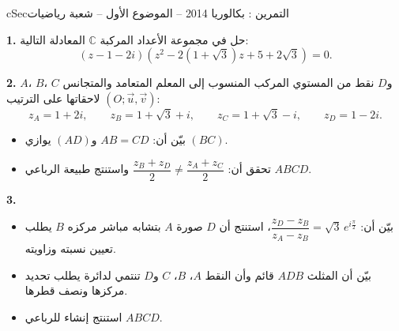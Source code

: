 \documentclass[12pt,a4paper]{article}
\newenvironment{BOX}[2]{\begin{otherlanguage}{english}\begin{arbox}{#1}{#2}}{\end{arbox}\end{otherlanguage}}
\newcounter{exo}
\newenvironment{tamrin}[1]{\stepcounter{exo}\begin{BOX}{cSec}{التمرين \theexo: #1}}{\end{BOX}}
\newenvironment{sq}{\begin{itemize}[leftmargin=2.4em,itemsep=3pt]}{\end{itemize}}
\newcommand{\qa}{\item[(أ)]}\newcommand{\qb}{\item[(ب)]}\newcommand{\qc}{\item[(جـ)]}\newcommand{\qd}{\item[(د)]}\newcommand{\qe}{\item[(هـ)]}
\newcommand{\QQ}[1]{\par\smallskip\textbf{#1.} }
\begin{document}
\providecommand{\MtwoAx}[4]{%
 \draw[gray!20,very thin] (#1,#3) grid (#2,#4);
 \draw[-{Stealth[length=2mm]}] (#1,0)--(#2,0) node[below left]{$x$};
 \draw[-{Stealth[length=2mm]}] (0,#3)--(0,#4) node[below left]{$y$};
 \node[below left,font=\scriptsize] at (0,0){$O$};
 \draw[-{Stealth[length=1.6mm]},thick] (0,0)--(1,0) node[below,font=\scriptsize]{$\vec u$};
 \draw[-{Stealth[length=1.6mm]},thick] (0,0)--(0,1) node[left,font=\scriptsize]{$\vec v$};}
\providecommand{\MtwoPt}[3]{\fill (#1) circle (1.6pt) node[#2,font=\small]{$#3$};}

\begin{tamrin}{بكالوريا 2014 -- الموضوع الأول -- شعبة رياضيات}
\QQ{1} حل في مجموعة الأعداد المركبة $\mathbb{C}$ المعادلة التالية:
\[(z-1-2i)\left(z^2-2\left(1+\sqrt3\right)z+5+2\sqrt3\right)=0.\]
\QQ{2} $A$، $B$، $C$ و$D$ نقط من المستوي المركب المنسوب إلى المعلم المتعامد والمتجانس $(O;\vec u,\vec v)$ لاحقاتها على الترتيب:
\[z_A=1+2i,\qquad z_B=1+\sqrt3+i,\qquad z_C=1+\sqrt3-i,\qquad z_D=1-2i.\]
\begin{sq}
\qa بيّن أن: $AB=CD$ و$(AD)$ يوازي $(BC)$.
\qb تحقق أن: $\dfrac{z_B+z_D}{2}\neq\dfrac{z_A+z_C}{2}$ واستنتج طبيعة الرباعي $ABCD$.
\end{sq}
\QQ{3}
\begin{sq}
\qa بيّن أن: $\dfrac{z_D-z_B}{z_A-z_B}=\sqrt3\,e^{i\frac{\pi}{2}}$، استنتج أن $D$ صورة $A$ بتشابه مباشر مركزه $B$ يطلب تعيين نسبته وزاويته.
\qb بيّن أن المثلث $ADB$ قائم وأن النقط $A$، $B$، $C$ و$D$ تنتمي لدائرة يطلب تحديد مركزها ونصف قطرها.
\qc استنتج إنشاء للرباعي $ABCD$.
\end{sq}
\end{tamrin}
\end{document}
